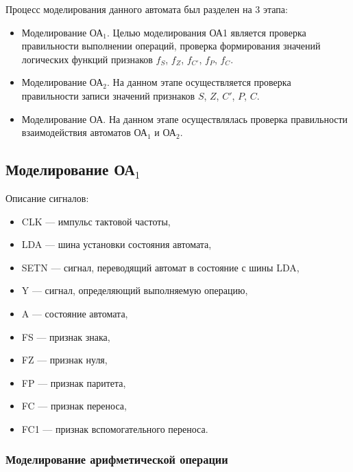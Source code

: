 Процесс моделирования данного автомата был разделен на 3 этапа:
\begin{itemize}
	\item Моделирование ОА$_1$. Целью моделирования ОА1 является проверка правильности выполнении операций, проверка формирования значений логических функций признаков $f_S$, $f_Z$, $f_{C'}$, $f_P$, $f_C$. 
	\item Моделирование ОА$_2$. На данном этапе осуществляется проверка правильности записи значений признаков $S$, $Z$, $C'$, $P$, $C$.
	\item Моделирование ОА. На данном этапе осуществлялась проверка правильности взаимодействия автоматов ОА$_1$ и ОА$_2$. 
\end{itemize}

\subsection{Моделирование ОА$_1$}

Описание сигналов:
\begin{itemize}	
	\item CLK --- импульс тактовой частоты,
	
	\item LDA ---  шина установки состояния автомата,
	
	\item SETN --- сигнал, переводящий автомат в состояние с шины LDA,
	
	\item Y --- сигнал, определяющий выполняемую операцию,
	
	\item A --- состояние автомата,
	
	\item FS --- признак знака,
	
	\item FZ --- признак нуля,
	
	\item FP --- признак паритета,
	
	\item FC --- признак переноса,
	
	\item FC1 --- признак вспомогательного переноса.
\end{itemize}


\subsubsection{Моделирование арифметической операции}

